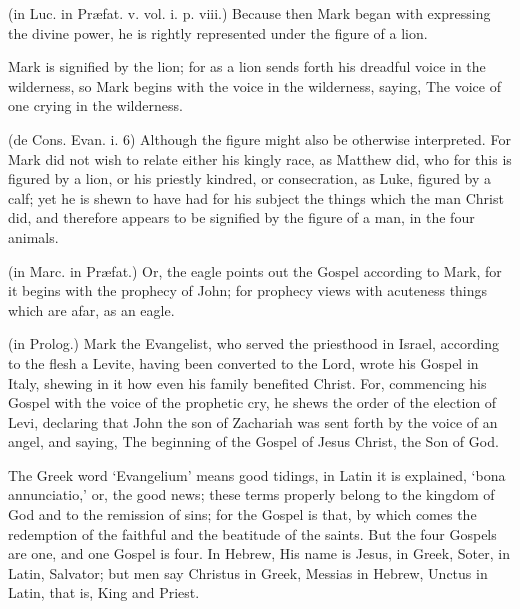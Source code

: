  (in Luc. in Præfat. v. vol. i. p. viii.) Because then Mark began with expressing the divine power, he is rightly represented under the figure of a lion.

 Mark is signified by the lion; for as a lion sends forth his dreadful voice in the wilderness, so Mark begins with the voice in the wilderness, saying, The voice of one crying in the wilderness.

 (de Cons. Evan. i. 6) Although the figure might also be otherwise interpreted. For Mark did not wish to relate either his kingly race, as Matthew did, who for this is figured by a lion, or his priestly kindred, or consecration, as Luke, figured by a calf; yet he is shewn to have had for his subject the things which the man Christ did, and therefore appears to be signified by the figure of a man, in the four animals.

 (in Marc. in Præfat.) Or, the eagle points out the Gospel according to Mark, for it begins with the prophecy of John; for prophecy views with acuteness things which are afar, as an eagle.


 

 (in Prolog.) Mark the Evangelist, who served the priesthood in Israel, according to the flesh a Levite, having been converted to the Lord, wrote his Gospel in Italy, shewing in it how even his family benefited Christ. For, commencing his Gospel with the voice of the prophetic cry, he shews the order of the election of Levi, declaring that John the son of Zachariah was sent forth by the voice of an angel, and saying, The beginning of the Gospel of Jesus Christ, the Son of God.

 The Greek word ‘Evangelium’ means good tidings, in Latin it is explained, ‘bona annunciatio,’ or, the good news; these terms properly belong to the kingdom of God and to the remission of sins; for the Gospel is that, by which comes the redemption of the faithful and the beatitude of the saints. But the four Gospels are one, and one Gospel is four. In Hebrew, His name is Jesus, in Greek, Soter, in Latin, Salvator; but men say Christus in Greek, Messias in Hebrew, Unctus in Latin, that is, King and Priest.

